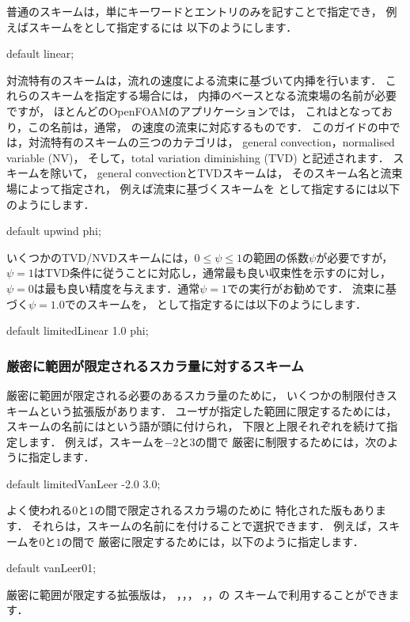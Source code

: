 普通のスキームは，単にキーワードとエントリのみを記すことで指定でき，
例えばスキームをとして指定するには
以下のようにします．
\begin{OFverbatim}[file]
default linear;
\end{OFverbatim}
対流特有のスキームは，流れの速度による流束に基づいて内挿を行います．
これらのスキームを指定する場合には，
内挿のベースとなる流束場の名前が必要ですが，
ほとんどのOpenFOAMのアプリケーションでは，
これはとなっており，この名前は，通常，
の速度の流束に対応するものです．
このガイドの中では，対流特有のスキームの三つのカテゴリは，
general convection，normalised variable (NV)，
そして，total variation diminishing (TVD) と記述されます．
スキームを除いて，
general convectionとTVDスキームは，
そのスキーム名と流束場によって指定され，
例えば流束に基づくスキームを
として指定するには以下のようにします．
\begin{OFverbatim}[file]
default upwind phi;
\end{OFverbatim}
いくつかのTVD/NVDスキームには，$0 \le \psi \le 1$の範囲の係数$\psi$が必要ですが，
$\psi = 1$はTVD条件に従うことに対応し，通常最も良い収束性を示すのに対し，
$\psi = 0$は最も良い精度を与えます．通常$\psi = 1$での実行がお勧めです．
流束に基づく$\psi = 1.0$でのスキームを，
として指定するには以下のようにします．
\begin{OFverbatim}[file]
default limitedLinear 1.0 phi;
\end{OFverbatim}

\subsubsection{厳密に範囲が限定されるスカラ量に対するスキーム}
\label{sssec:4.4.1.1}
厳密に範囲が限定される必要のあるスカラ量のために，
いくつかの制限付きスキームという拡張版があります．
ユーザが指定した範囲に限定するためには，
スキームの名前にはという語が頭に付けられ，
下限と上限それぞれを続けて指定します．
例えば，スキームを$-2$と$3$の間で
厳密に制限するためには，次のように指定します．
\begin{OFverbatim}[file]
default limitedVanLeer -2.0 3.0;
\end{OFverbatim}
よく使われる$0$と$1$の間で限定されるスカラ場のために
特化された版もあります．
それらは，スキームの名前にを付けることで選択できます．
例えば，スキームを$0$と$1$の間で
厳密に限定するためには，以下のように指定します．
\begin{OFverbatim}[file]
default vanLeer01;
\end{OFverbatim}
厳密に範囲が限定する拡張版は，
，，，
，，の
スキームで利用することができます．

